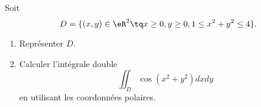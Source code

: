 
\begin{exercice}\label{exoOutilsMath-0145}

    Soit
    \begin{equation}
        D=\{ (x,y)\in \eR^2\tq x\geq 0,y\geq 0,1\leq x^2+y^2\leq 4 \}.
    \end{equation}
    \begin{enumerate}
        \item
            Représenter \( D\).
        \item
            Calculer l'intégrale double
            \begin{equation}
                \iint_D\cos(x^2+y^2)dxdy
            \end{equation}
            en utilisant les coordonnées polaires.
    \end{enumerate}

\end{exercice}
